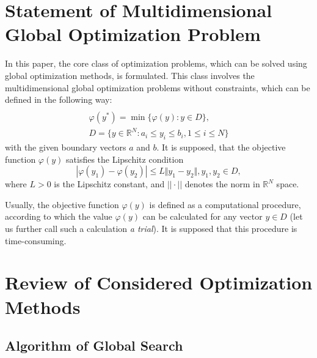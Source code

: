 \documentclass[runningheads]{llncs}
\begin{document}
\section{Statement of Multidimensional Global Optimization Problem}
In this paper, the core class of optimization problems, which can be solved using
global optimization methods, is formulated. This class involves the multidimensional global
optimization problems without constraints, which can be defined in the following way:
\begin{equation}
\label{eq:task}
\begin{array}{cr}\\
  \varphi(y^*)=\min\{\varphi(y):y\in D\}, \\
  D=\{y\in \mathbb{R}^N:a_i\leq y_i\leq{b_i}, 1\leq{i}\leq{N}\}
\end{array}
\end{equation}
with the given boundary vectors  $a$ and  $b$. It is supposed, that the objective function
\(\varphi(y)\) satisfies the Lipschitz condition
\begin{equation}
\label{eq:lip}
|\varphi(y_1)-\varphi(y_2)|\leq L\Vert y_1-y_2\Vert,y_1,y_2\in D,
\end{equation}
where \(L>0\) is the Lipschitz constant, and \(||\cdot||\) denotes the norm in \(\mathbb{R}^N\)
space.
\par
Usually, the objective function \(\varphi(y)\) is defined as a computational procedure,
according to which the value \(\varphi(y)\) can be calculated for any vector \(y\in D\)
(let us further call such a calculation \textit{a trial}). It is supposed that this procedure
is time-consuming.

\section{Review of Considered Optimization Methods}

\subsection{Algorithm of Global Search}
\label{sub:ags}
\end{document}
